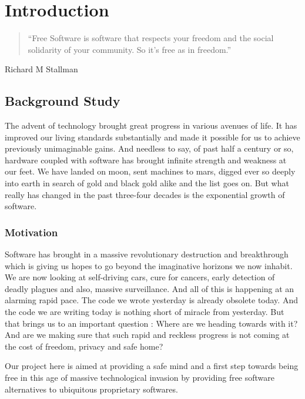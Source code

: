 \chapter{Introduction}
\begin{quotation}
“Free Software is software that respects your freedom and the social solidarity of your community. So it’s free as in freedom.”
\end{quotation}
\begin{flushright}
Richard M Stallman
\end{flushright}

\section{Background Study}
The advent of technology brought great progress in various avenues of life. It has improved our living standards substantially and made it possible for us to achieve previously unimaginable gains. And needless to say, of past half a century or so, hardware coupled with software has brought infinite strength and weakness at our feet. We have landed on moon, sent machines to mars, digged ever so deeply into earth in search of gold and black gold alike and the list goes on. But what really has changed in the past three-four decades is the exponential growth of software.


\subsection{Motivation}
Software has brought in a massive revolutionary destruction and breakthrough which is giving us hopes to go beyond the imaginative horizons we now inhabit. We are now looking at self-driving cars, cure for cancers, early detection of deadly plagues and also, massive surveillance. And all of this is happening at an alarming rapid pace. The code we wrote yesterday is already obsolete today. And the code we are writing today is nothing short of miracle from yesterday. But that brings us to an important question : Where are we heading towards with it? And are we making sure that such rapid and reckless progress is not coming at the cost of freedom, privacy and safe home?

Our project here is aimed at providing a safe mind and a first step towards being free in this age of massive technological invasion by providing free software alternatives to ubiquitous proprietary softwares. 

